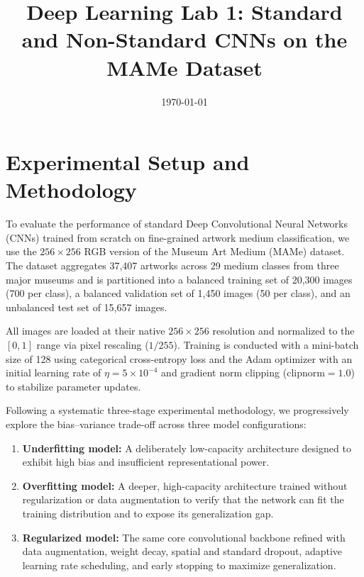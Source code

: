 \documentclass[11pt, a4paper]{article}
\title{Deep Learning Lab 1: Standard and Non-Standard CNNs on the MAMe Dataset}
\date{\today}
\begin{document}
\maketitle

\section{Experimental Setup and Methodology}

To evaluate the performance of standard Deep Convolutional Neural Networks (CNNs) trained from scratch on fine-grained artwork medium classification, we use the $256 \times 256$ RGB version of the Museum Art Medium (MAMe) dataset. The dataset aggregates 37,407 artworks across 29 medium classes from three major museums and is partitioned into a balanced training set of 20,300 images (700 per class), a balanced validation set of 1,450 images (50 per class), and an unbalanced test set of 15,657 images.

All images are loaded at their native $256 \times 256$ resolution and normalized to the $[0, 1]$ range via pixel rescaling ($1/255$). Training is conducted with a mini-batch size of 128 using categorical cross-entropy loss and the Adam optimizer with an initial learning rate of $\eta = 5 \times 10^{-4}$ and gradient norm clipping ($\text{clipnorm} = 1.0$) to stabilize parameter updates.

Following a systematic three-stage experimental methodology, we progressively explore the bias--variance trade-off across three model configurations:
\begin{enumerate}
    \item \textbf{Underfitting model:} A deliberately low-capacity architecture designed to exhibit high bias and insufficient representational power.
    \item \textbf{Overfitting model:} A deeper, high-capacity architecture trained without regularization or data augmentation to verify that the network can fit the training distribution and to expose its generalization gap.
    \item \textbf{Regularized model:} The same core convolutional backbone refined with data augmentation, weight decay, spatial and standard dropout, adaptive learning rate scheduling, and early stopping to maximize generalization.
\end{enumerate}
\end{document}
